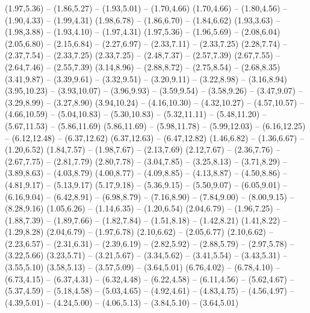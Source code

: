 \providecommand\Autobahn[1]{\csname geo:Autobahn:#1\endcsname}
\def\AutobahnListe{A1,A2,A3,A4,A5,A6,A7,A8,A9,A10,A11,A12,A13,A14,A15,A17,A19,A20,A21,A23,A24,A25,A27,A28,A29,A30,A31,A33,A35,A38,A39,A40,A43,A44,A45,A46,A48,A52,A57,A59,A60,A61,A62,A63,A65,A66,A70,A71,A72,A73,A81,A92,A93,A95,A96,A115,A143,A210,A215,A241,A250,A280,A392,A445,A480,A560,A565,A620}
\expandafter\def\csname geo:Autobahn:A1\endcsname{
  (1.97,5.36) -- (1.86,5.27) -- (1.93,5.01) -- (1.70,4.66)
  (1.70,4.66) -- (1.80,4.56) -- (1.90,4.33) -- (1.99,4.31)
  (1.98,6.78) -- (1.86,6.70) -- (1.84,6.62)
  (1.93,3.63) -- (1.98,3.88) -- (1.93,4.10) -- (1.97,4.31)
  (1.97,5.36) -- (1.96,5.69) -- (2.08,6.04)
  (2.05,6.80) -- (2.15,6.84) -- (2.27,6.97) -- (2.33,7.11) -- (2.33,7.25)
  (2.28,7.74) -- (2.37,7.54) -- (2.33,7.25)
  (2.33,7.25) -- (2.48,7.37) -- (2.57,7.39)
  (2.67,7.55) -- (2.64,7.46) -- (2.55,7.39)
  (3.14,8.96) -- (2.88,8.72) -- (2.75,8.54) -- (2.68,8.35)
  (3.41,9.87) -- (3.39,9.61) -- (3.32,9.51) -- (3.20,9.11) -- (3.22,8.98) -- (3.16,8.94)
  (3.95,10.23) -- (3.93,10.07) -- (3.96,9.93) -- (3.59,9.54) -- (3.58,9.26) -- (3.47,9.07) -- (3.29,8.99) -- (3.27,8.90)
  (3.94,10.24) -- (4.16,10.30) -- (4.32,10.27) -- (4.57,10.57) -- (4.66,10.59) -- (5.04,10.83) -- (5.30,10.83) -- (5.32,11.11) -- (5.48,11.20) -- (5.67,11.53) -- (5.86,11.69)
  (5.86,11.69) -- (5.98,11.78) -- (5.99,12.03) -- (6.16,12.25) -- (6.12,12.48) -- (6.37,12.62)
  (6.37,12.63) -- (6.47,12.82)}
\expandafter\def\csname geo:Autobahn:A2\endcsname{
  (1.46,6.82) -- (1.36,6.67) -- (1.20,6.52)
  (1.84,7.57) -- (1.98,7.67) -- (2.13,7.69)
  (2.12,7.67) -- (2.36,7.76) -- (2.67,7.75) -- (2.81,7.79)
  (2.80,7.78) -- (3.04,7.85) -- (3.25,8.13) -- (3.71,8.29) -- (3.89,8.63) -- (4.03,8.79)
  (4.00,8.77) -- (4.09,8.85) -- (4.13,8.87) -- (4.50,8.86) -- (4.81,9.17) -- (5.13,9.17)
  (5.17,9.18) -- (5.36,9.15) -- (5.50,9.07) -- (6.05,9.01) -- (6.16,9.04) -- (6.42,8.91) -- (6.98,8.79) -- (7.16,8.90) -- (7.84,9.00) -- (8.00,9.15) -- (8.28,9.16)}
\expandafter\def\csname geo:Autobahn:A3\endcsname{
  (1.05,6.26) -- (1.14,6.35) -- (1.20,6.54)
  (2.04,6.79) -- (1.96,7.25) -- (1.88,7.39) -- (1.89,7.66) -- (1.82,7.84) -- (1.51,8.18) -- (1.42,8.21)
  (1.41,8.22) -- (1.29,8.28)
  (2.04,6.79) -- (1.97,6.78)
  (2.10,6.62) -- (2.05,6.77)
  (2.10,6.62) -- (2.23,6.57) -- (2.31,6.31) -- (2.39,6.19) -- (2.82,5.92) -- (2.88,5.79) -- (2.97,5.78) -- (3.22,5.66)
  (3.23,5.71) -- (3.21,5.67) -- (3.34,5.62) -- (3.41,5.54) -- (3.43,5.31) -- (3.55,5.10)
  (3.58,5.13) -- (3.57,5.09) -- (3.64,5.01)
  (6.76,4.02) -- (6.78,4.10) -- (6.73,4.15) -- (6.37,4.31) -- (6.32,4.48) -- (6.22,4.58) -- (6.11,4.56) -- (5.62,4.67) -- (5.37,4.59) -- (5.18,4.58) -- (5.03,4.65) -- (4.92,4.61) -- (4.83,4.75) -- (4.56,4.97) -- (4.39,5.01) -- (4.24,5.00) -- (4.06,5.13) -- (3.84,5.10) -- (3.64,5.01)}

